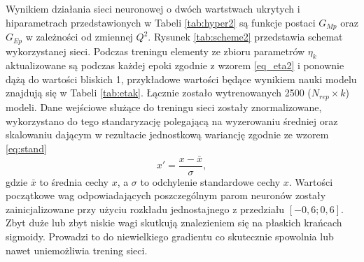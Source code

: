 \documentclass[11pt]{book}
\theoremstyle{definition}
\begin{document}
Wynikiem działania sieci neuronowej o dwóch wartstwach ukrytych i hiparametrach przedstawionych w Tabeli \ref{tab:hyper2} są funkcje postaci $G_{Mp}$ oraz $G_{Ep}$ w zależności od zmiennej $Q^2$. Rysunek \ref{tab:scheme2} przedstawia schemat wykorzystanej sieci. Podczas treningu elementy ze zbioru parametrów $\eta_k$ aktualizowane są podczas każdej epoki zgodnie z wzorem \ref{eq_eta2} i ponownie dążą do wartości bliskich 1, przykładowe wartości będące wynikiem nauki modelu znajdują się w Tabeli \ref{tab:etak}. Łącznie zostało wytrenowanych 2500 ($N_{rep} \times k$) modeli. Dane wejściowe służące do treningu sieci zostały znormalizowane, wykorzystano do tego standaryzację polegającą na wyzerowaniu średniej oraz skalowaniu dającym w rezultacie jednostkową wariancję zgodnie ze wzorem \ref{eq:stand}
%
\begin{equation}
x' = \frac{x-\bar{x}}{\sigma} \label{eq:stand},
\end{equation}
%
gdzie $\bar{x}$ to średnia cechy $x$, a $\sigma$ to odchylenie standardowe cechy $x$. Wartości początkowe wag odpowiadających poszczególnym parom neuronów zostały zainicjalizowane przy użyciu rozkładu jednostajnego z przedziału $\left[-0,6; 0,6\right]$. Zbyt duże lub zbyt niskie wagi skutkują znalezieniem się na płaskich krańcach sigmoidy.  Prowadzi to do niewielkiego gradientu co skutecznie spowolnia lub nawet uniemożliwia trening sieci.
%
\end{document}
